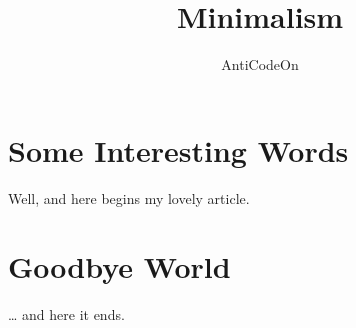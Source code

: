 \documentclass[a4paper,11pt]{report}
\author{AntiCodeOn}
\title{Minimalism}
\begin{document}
\maketitle
\tableofcontents
\section{Some Interesting Words}
Well, and here begins my lovely article.
\section{Goodbye World}
\ldots{} and here it ends.
\end{document}
